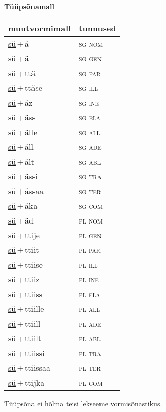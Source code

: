 
\vspace{1.8em}
\begin{minipage}{\textwidth}
\textbf{Tüüpsõnamall \,}\\

\begin{sideways}
\begin{tabular}{l l}
muutvormimall & tunnused \\
\hline
\underline{sü}\,+\,ä & \textsc{ sg nom } \\
\underline{sü}\,+\,ä & \textsc{ sg gen } \\
\underline{sü}\,+\,ttä & \textsc{ sg par } \\
\underline{sü}\,+\,ttäse & \textsc{ sg ill } \\
\underline{sü}\,+\,äz & \textsc{ sg ine } \\
\underline{sü}\,+\,äss & \textsc{ sg ela } \\
\underline{sü}\,+\,älle & \textsc{ sg all } \\
\underline{sü}\,+\,äll & \textsc{ sg ade } \\
\underline{sü}\,+\,ält & \textsc{ sg abl } \\
\underline{sü}\,+\,ässi & \textsc{ sg tra } \\
\underline{sü}\,+\,ässaa & \textsc{ sg ter } \\
\underline{sü}\,+\,äka & \textsc{ sg com } \\
\underline{sü}\,+\,äd & \textsc{ pl nom } \\
\underline{sü}\,+\,ttije & \textsc{ pl gen } \\
\underline{sü}\,+\,ttiit & \textsc{ pl par } \\
\underline{sü}\,+\,ttiise & \textsc{ pl ill } \\
\underline{sü}\,+\,ttiiz & \textsc{ pl ine } \\
\underline{sü}\,+\,ttiiss & \textsc{ pl ela } \\
\underline{sü}\,+\,ttiille & \textsc{ pl all } \\
\underline{sü}\,+\,ttiill & \textsc{ pl ade } \\
\underline{sü}\,+\,ttiilt & \textsc{ pl abl } \\
\underline{sü}\,+\,ttiissi & \textsc{ pl tra } \\
\underline{sü}\,+\,ttiissaa & \textsc{ pl ter } \\
\underline{sü}\,+\,ttijka & \textsc{ pl com } \\
\end{tabular}
\end{sideways}
\label{tab:tüüpsõnamall-süä}

\end{minipage}

 
\vspace{1em}
\noindent Tüüpsõna ei hõlma teisi lekseeme vormi\-sõnastikus.
